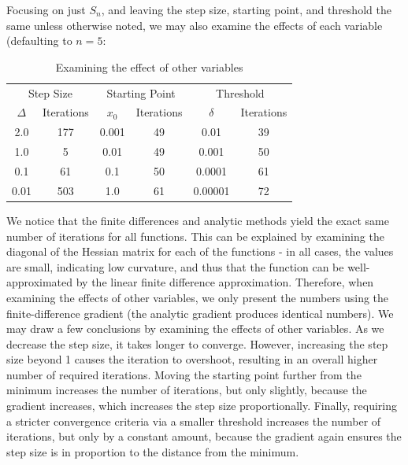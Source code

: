 \documentclass[11pt,letterpaper]{article}
\begin{document}
Focusing on just $S_n$, and leaving the step size, starting point, and threshold the same unless otherwise noted, we may also examine the effects of each variable (defaulting to $n=5$:

\begin{table}[h]
\centering
\caption{Examining the effect of other variables}
\begin{tabular}{cc|cc|cc}
\multicolumn{2}{c}{Step Size}& \multicolumn{2}{|c}{Starting Point} & \multicolumn{2}{|c}{Threshold} \\
$\Delta$  & Iterations        & $x_0$   & Iterations   & $\delta$  & Iterations     \\\hline
2.0       & 177               & 0.001   & 49           & 0.01      & 39     \\
1.0       & 5                 & 0.01    & 49           & 0.001     & 50     \\
0.1       & 61                & 0.1     & 50           & 0.0001    & 61     \\
0.01      & 503               & 1.0     & 61           & 0.00001   & 72  
\end{tabular}
\end{table}

We notice that the finite differences and analytic methods yield the exact same number of iterations for all functions. This can be explained by examining the diagonal of the Hessian matrix for each of the functions - in all cases, the values are small, indicating low curvature, and thus that the function can be well-approximated by the linear finite difference approximation. Therefore, when examining the effects of other variables, we only present the numbers using the finite-difference gradient (the analytic gradient produces identical numbers). We may draw a few conclusions by examining the effects of other variables. As we decrease the step size, it takes longer to converge. However, increasing the step size beyond 1 causes the iteration to overshoot, resulting in an overall higher number of required iterations. Moving the starting point further from the minimum increases the number of iterations, but only slightly, because the gradient increases, which increases the step size proportionally. Finally, requiring a stricter convergence criteria via a smaller threshold increases the number of iterations, but only by a constant amount, because the gradient again ensures the step size is in proportion to the distance from the minimum.\\
\end{document}
